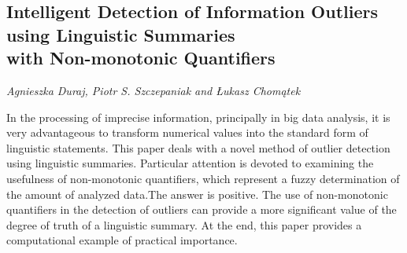 \documentclass[../booklet.tex]{subfiles}
\begin{document}
\subsection[Intelligent Detection of Information Outliers using Linguistic Summaries \\with Non-monotonic Quantifiers. {\it Agnieszka Duraj, Piotr S. Szczepaniak and Łukasz Chomątek}]{Intelligent Detection of Information Outliers using Linguistic Summaries \\with Non-monotonic Quantifiers}
  

\begin{center}
  {\it Agnieszka Duraj, Piotr S. Szczepaniak and Łukasz Chomątek}
\end{center}

\vskip 0.8cm


In the processing of imprecise information, principally in big data analysis, it is very advantageous to transform numerical values into the standard form of linguistic statements. 
This paper deals with a novel method of outlier detection using linguistic summaries. Particular attention is devoted to examining the usefulness of non-monotonic quantifiers, which represent a fuzzy determination of the amount of analyzed data.The answer is positive. The use of non-monotonic quantifiers in the detection of outliers can provide a more significant value of the degree of truth of a linguistic summary. At the end, this paper provides a computational example of practical importance.

\end{document}
